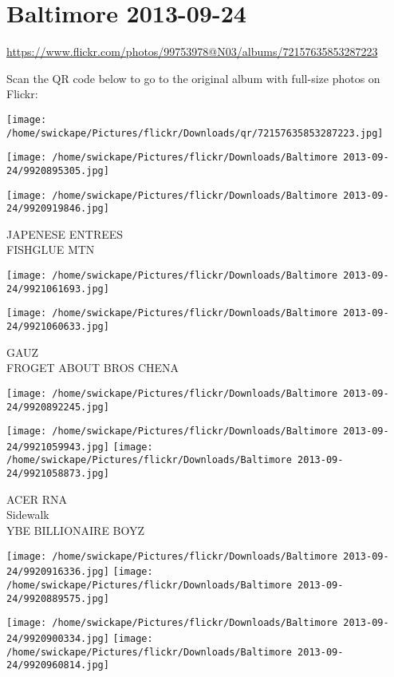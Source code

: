 \documentclass[10pt,letterpaper]{article}
\title{}
\author{}
\date{}
\begin{document}
\section*{Baltimore 2013-09-24}

\url{https://www.flickr.com/photos/99753978@N03/albums/72157635853287223}

Scan the QR code below to go to the original album with full-size photos on Flickr:

\texttt{[image: /home/swickape/Pictures/flickr/Downloads/qr/72157635853287223.jpg]}
\pagebreak

\texttt{[image: /home/swickape/Pictures/flickr/Downloads/Baltimore 2013-09-24/9920895305.jpg]}

\vspace{0.25in}
\texttt{[image: /home/swickape/Pictures/flickr/Downloads/Baltimore 2013-09-24/9920919846.jpg]}

JAPENESE ENTREES\\
FISHGLUE MTN
\pagebreak

\texttt{[image: /home/swickape/Pictures/flickr/Downloads/Baltimore 2013-09-24/9921061693.jpg]}

\vspace{0.25in}
\texttt{[image: /home/swickape/Pictures/flickr/Downloads/Baltimore 2013-09-24/9921060633.jpg]}

GAUZ\\
FROGET ABOUT BROS CHENA
\pagebreak

\texttt{[image: /home/swickape/Pictures/flickr/Downloads/Baltimore 2013-09-24/9920892245.jpg]}

\vspace{0.25in}
\texttt{[image: /home/swickape/Pictures/flickr/Downloads/Baltimore 2013-09-24/9921059943.jpg]}
\texttt{[image: /home/swickape/Pictures/flickr/Downloads/Baltimore 2013-09-24/9921058873.jpg]}

ACER RNA\\
Sidewalk\\
YBE BILLIONAIRE BOYZ
\pagebreak

\texttt{[image: /home/swickape/Pictures/flickr/Downloads/Baltimore 2013-09-24/9920916336.jpg]}
\texttt{[image: /home/swickape/Pictures/flickr/Downloads/Baltimore 2013-09-24/9920889575.jpg]}

\texttt{[image: /home/swickape/Pictures/flickr/Downloads/Baltimore 2013-09-24/9920900334.jpg]}
\texttt{[image: /home/swickape/Pictures/flickr/Downloads/Baltimore 2013-09-24/9920960814.jpg]}
\end{document}
